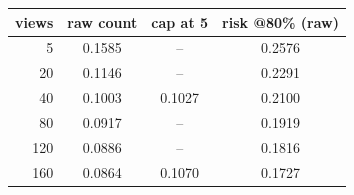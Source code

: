 \begin{tabular}{rccc}
\toprule
views & raw count & cap at 5 & risk @80\% (raw) \\
\midrule
5 & 0.1585 & -- & 0.2576 \\
20 & 0.1146 & -- & 0.2291 \\
40 & 0.1003 & 0.1027 & 0.2100 \\
80 & 0.0917 & -- & 0.1919 \\
120 & 0.0886 & -- & 0.1816 \\
160 & 0.0864 & 0.1070 & 0.1727 \\
\bottomrule
\end{tabular}
